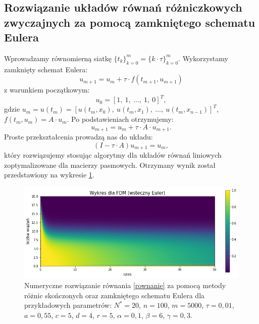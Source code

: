 \documentclass{article}
\begin{document}

\subsection{Rozwiązanie układów równań różniczkowych zwyczajnych za pomocą zamkniętego schematu Eulera} 
Wprowadzamy równomierną siatkę $\{t_k\}_{k=0}^{m} = \{k\cdot\tau\}_{k=0}^{m}$. Wykorzystamy zamknięty schemat Eulera:
\begin{equation*}
u_{m+1} = u_{m} + \tau \cdot f(t_{m+1}, u_{m+1})
\end{equation*}
z warunkiem początkowym:
\begin{equation*}
u_{0} = [1, \ 1, \ \dots, \ 1, \ 0]^{T},
\end{equation*}
gdzie $u_{m} = u(t_m) = [u(t_{m}, x_{0}), \ u(t_{m}, x_{1}), \ \dots , \ u(t_{m}, x_{n-1}) ]^{T}$, $f(t_{m}, u_{m}) = A \cdot u_m$. Po podstawieniach otrzymujemy:
\begin{equation*}
u_{m+1} = u_{m} + \tau \cdot A \cdot u_{m+1}.
\end{equation*}
Proste przekształcenia prowadzą nas do układu:
\begin{equation*}
(I - \tau \cdot A)u_{m+1} = u_{m},
\end{equation*}
który rozwiązujemy stosując algorytmy dla układów równań liniowych zoptymalizowane dla macierzy pasmowych. Otrzymany wynik został przedstawiony na wykresie \ref{mrs euler}.
\begin{figure}[h!]
	\centering
	\includegraphics[width=\textwidth]{images/wykres_fdm_euler.pdf}
	\caption{Numeryczne rozwiązanie równania \eqref{rownanie} za pomocą metody różnic skończonych oraz zamkniętego schematu Eulera dla przykładowych parametrów: $N^{*}=20$, $n=100$, $m=5000$, $\tau=0,01$, $a=0,55$, $c=5$, $d=4$, $r=5$, $\alpha=0,1$, $\beta=6$, $\gamma=0,3$. }\label{mrs euler}
\end{figure}

\end{document}
